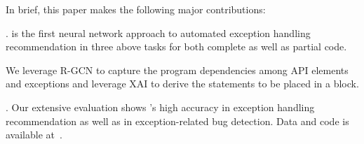 
In brief, this paper makes the following major contributions:

. {\tool} is the first neural network approach to
  automated exception handling recommendation in three above tasks for both complete as
  well as partial code.

   We
  leverage R-GCN to capture the program
  dependencies among API elements and exceptions and leverage XAI
  to derive the statements to be placed in a  block.

  . Our extensive evaluation
  shows {\tool}'s high accuracy in exception handling recommendation
  as well as in exception-related bug detection. Data and code is
  available at~\cite{deepex-website}.
            



